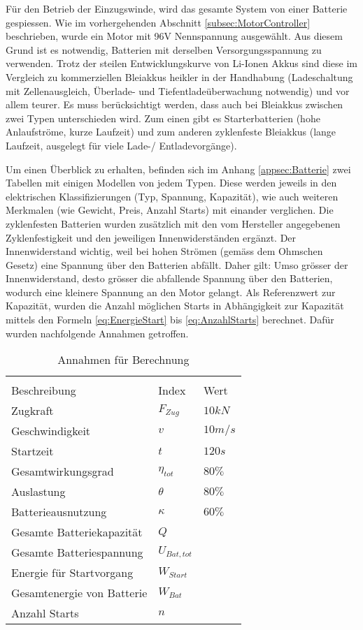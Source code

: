 Für den Betrieb der Einzugswinde, wird das gesamte System von einer Batterie gespiessen. Wie im vorhergehenden Abschnitt \ref{subsec:MotorController} beschrieben, wurde ein Motor mit 96V Nennspannung ausgewählt. Aus diesem Grund ist es notwendig, Batterien mit derselben Versorgungsspannung zu verwenden. Trotz der steilen Entwicklungskurve von Li-Ionen Akkus sind diese im Vergleich zu kommerziellen Bleiakkus heikler in der Handhabung (Ladeschaltung mit Zellenausgleich, Überlade- und Tiefentladeüberwachung notwendig) und vor allem teurer. Es muss berücksichtigt werden, dass auch bei Bleiakkus zwischen zwei Typen unterschieden wird. Zum einen gibt es Starterbatterien (hohe Anlaufströme, kurze Laufzeit) und zum anderen zyklenfeste Bleiakkus (lange Laufzeit, ausgelegt für viele Lade-/ Entladevorgänge).

Um einen Überblick zu erhalten, befinden sich im Anhang \ref{appsec:Batterie} zwei Tabellen mit einigen Modellen von jedem Typen. Diese werden jeweils in den elektrischen Klassifizierungen (Typ, Spannung, Kapazität), wie auch weiteren Merkmalen (wie Gewicht, Preis, Anzahl Starts) mit einander verglichen. Die zyklenfesten Batterien wurden zusätzlich mit den vom Hersteller angegebenen Zyklenfestigkeit und den jeweiligen Innenwiderständen ergänzt. Der Innenwiderstand wichtig, weil bei hohen Strömen (gemäss dem Ohmschen Gesetz) eine Spannung über den Batterien abfällt. Daher gilt: Umso grösser der Innenwiderstand, desto grösser die abfallende Spannung über den Batterien, wodurch eine kleinere Spannung an den Motor gelangt.
Als Referenzwert zur Kapazität, wurden die Anzahl möglichen Starts in Abhängigkeit zur Kapazität mittels den Formeln \ref{eq:EnergieStart} bis \ref{eq:AnzahlStarts} berechnet. Dafür wurden nachfolgende Annahmen getroffen. 

\begin{table}[H]
	\centering
	\begin{tabular}{C{5cm} C{2.5cm} C{2cm}}
		\\
	{Beschreibung} & {Index} & {Wert} \\ \hline
	Zugkraft    &   $ F_{Zug} $    & $10 kN$   \\
	Geschwindigkeit    &   $ v $    & $10 m/s$   \\
	Startzeit    &   $ t $   & $120 s$   \\
	Gesamtwirkungsgrad    &  $ \eta_{tot} $    & $80\%$   \\
	Auslastung    &  $ \theta $   & $80\%$  \\
	Batterieausnutzung    &  $ \kappa $    & $60\%$   \\
	Gesamte Batteriekapazität   &   $ Q $    &   \\
	Gesamte Batteriespannung    &   $ U_{Bat,tot} $    &   \\
	Energie für Startvorgang    &   $ W_{Start} $    &   \\
	Gesamtenergie von Batterie   &   $ W_{Bat} $    &   \\
	Anzahl Starts    &   $ n $    &    \\	
	\end{tabular}
	\caption{Annahmen für Berechnung}
	\label{tab:BerechnungAnzahlStart}
\end{table}

